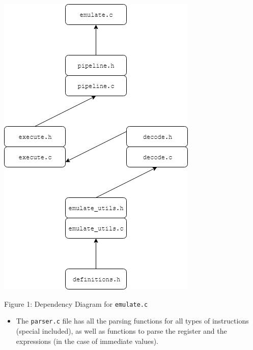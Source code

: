 \documentclass[11pt]{article}
\begin{document}
\hspace{0.05\linewidth}
\begin{minipage}{0.35\linewidth}

\centering

\includegraphics[scale=0.8]{diagrams/EmulatorDependencies.png}
\caption{Figure 1: Dependency Diagram for \texttt{emulate.c}}

\end{minipage}
    \begin{itemize}
    \item The \texttt{parser.c} file has all the parsing functions for all types of instructions (special included), as well as functions to parse the register and the expressions (in the case of immediate values).
    \end{itemize}
\end{document}
